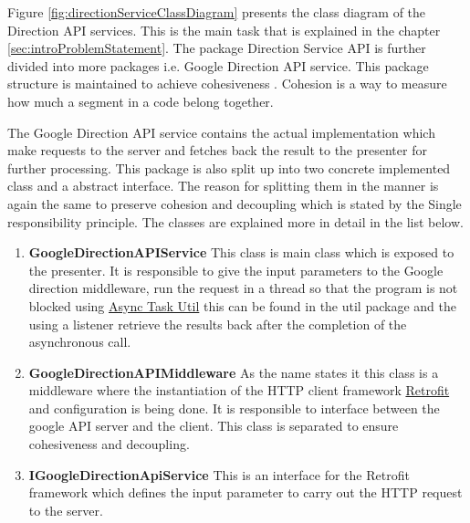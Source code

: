     \par
        \label{ssec:srp}
        Figure \ref{fig:directionServiceClassDiagram} presents the class diagram
        of the Direction API services. This is the main task that is explained
        in the chapter \ref{sec:introProblemStatement}.
        The package Direction Service API is further divided 
        into more packages i.e. Google Direction API service. This package 
        structure is maintained to achieve cohesiveness \cite{AdamCarlson}. Cohesion
        is a way to measure how much a segment in a code belong together. 
        
        \par
        The Google Direction API service contains the actual implementation 
        which make requests to the server and fetches back the result to the 
        presenter \cite{mvp} for further processing. This package is also split up into 
        two concrete implemented class and a abstract interface. The reason
        for splitting them in the manner is again the same to preserve cohesion
        and decoupling which is stated by the Single responsibility principle.
        The classes are explained more in detail in the list below. 
        \begin{enumerate}
            \item 
            \textbf{GoogleDirectionAPIService}
                This class is main class which is exposed to the presenter. It is
                responsible to give the input parameters to the Google direction 
                middleware, run the request in a thread so that the program is not
                blocked using \href{https://developer.android.com/reference/android/os/AsyncTask.html}
                {Async Task Util} this can be found in the util package and the using a listener
                retrieve the results back after the completion of the asynchronous call.
            \item 
            \textbf{GoogleDirectionAPIMiddleware}
                As the name states it this class is a middleware where the instantiation
                of the HTTP client framework \href{http://square.github.io/retrofit/} 
                {Retrofit} and configuration is being done. It is responsible
                to interface between the google API server and the client.
                This class is separated to ensure cohesiveness and decoupling.
            \item 
            \textbf{IGoogleDirectionApiService}
                This is an interface for the Retrofit framework which defines the input
                parameter to carry out the HTTP request to the server.
        \end{enumerate} 

